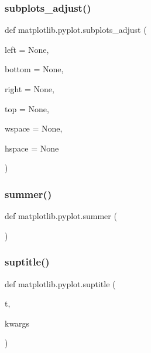 \subsubsection{\texorpdfstring{subplots\+\_\+adjust()}{subplots\_adjust()}}
{\footnotesize\ttfamily def matplotlib.\+pyplot.\+subplots\+\_\+adjust (\begin{DoxyParamCaption}\item[{}]{left = {\ttfamily None},  }\item[{}]{bottom = {\ttfamily None},  }\item[{}]{right = {\ttfamily None},  }\item[{}]{top = {\ttfamily None},  }\item[{}]{wspace = {\ttfamily None},  }\item[{}]{hspace = {\ttfamily None} }\end{DoxyParamCaption})}

\mbox{\label{namespacematplotlib_1_1pyplot_aa13ea888228033479728738fa167c8cc}} 
\subsubsection{\texorpdfstring{summer()}{summer()}}
{\footnotesize\ttfamily def matplotlib.\+pyplot.\+summer (\begin{DoxyParamCaption}{ }\end{DoxyParamCaption})}

\mbox{\label{namespacematplotlib_1_1pyplot_ae29fdb1bf2fa4ad83ef5fb0fb6fbf058}} 
\subsubsection{\texorpdfstring{suptitle()}{suptitle()}}
{\footnotesize\ttfamily def matplotlib.\+pyplot.\+suptitle (\begin{DoxyParamCaption}\item[{}]{t,  }\item[{}]{kwargs }\end{DoxyParamCaption})}

\mbox{\label{namespacematplotlib_1_1pyplot_a17625f79e32a9debfb67119529af0479}} 
